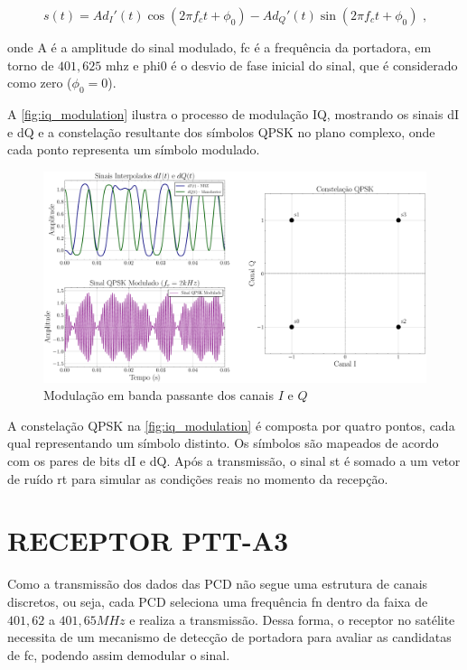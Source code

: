 \vspace{-0.8em}
\begin{equation}
    s(t) = A d_I'(t) \cos(2\pi f_c t + \phi_0) - Ad_Q'(t) \sin(2\pi f_c t + \phi_0) \text{ ,}
\end{equation}

\noindent onde \gls{A} é a amplitude do sinal modulado, \gls{fc} é a frequência da portadora, em torno de $401,625$ \gls{mhz} e \gls{phi0} é o desvio de fase inicial do sinal, que é considerado como zero ($\phi_0 = 0$).

A \autoref{fig:iq_modulation} ilustra o processo de modulação IQ, mostrando os sinais \gls{dI} e \gls{dQ} e a constelação resultante dos símbolos \gls{QPSK} no plano complexo, onde cada ponto representa um símbolo modulado.

\begin{figure}[H]
	\centering
	\caption{Modulação em banda passante dos canais $I$ e $Q$}\label{fig:iq_modulation}
	\includegraphics[width=\linewidth]{assets/cap2/iq_modulation.pdf}
\end{figure}

A constelação \gls{QPSK} na \autoref{fig:iq_modulation} é composta por quatro pontos, cada qual representando um símbolo distinto. Os símbolos são mapeados de acordo com os pares de bits \gls{dI} e \gls{dQ}. Após a transmissão, o sinal \gls{st} é somado a um vetor de ruído \gls{rt} para simular as condições reais no momento da recepção.

\section{RECEPTOR PTT-A3}

Como a transmissão dos dados das \gls{PCD} não segue uma estrutura de canais discretos, ou seja, cada \gls{PCD} seleciona uma frequência \gls{fn} dentro da faixa de $401,62$ a $401,65MHz$ e realiza a transmissão. Dessa forma, o receptor no satélite necessita de um mecanismo de detecção de portadora para avaliar as candidatas de \gls{fc}, podendo assim demodular o sinal.


